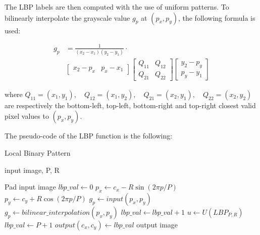 \documentclass[10pt,twocolumn,letterpaper]{article}
\begin{document}
The LBP labels are then computed with the use of uniform patterns.
To bilinearly interpolate the grayscale value $g_p$ at $(p_x, p_y)$, the following formula is used:

\begin{equation*}
	\begin{split} 
		g_p & = \frac{1}{(x_2 - x_1)(y_2 - y_1)} \cdot \\ &
		\begin{bmatrix}
			x_2 - p_x & p_x - x_1
		\end{bmatrix}
		\begin{bmatrix}
			Q_{11} & Q_{12} \\
			Q_{21} & Q_{22}
		\end{bmatrix}
		\begin{bmatrix}
			y_2 - p_y \\ 
			p_y - y_1
		\end{bmatrix}
	\end{split}
\end{equation*}


where $Q_{11} = (x_1, y_1), \quad Q_{12} = (x_1, y_2), \quad Q_{21} = (x_2, y_1), \quad Q_{22} = (x_2, y_2)$ are respectively the bottom-left, top-left, bottom-right and top-right closest valid pixel values to $(p_x, p_y)$.

The pseudo-code of the LBP function is the following:

\begin{algorithm}[H]
	\caption{Local Binary Pattern}
	\label{alg:lbp}
	\begin{algorithmic}
		\Require input image, P, R
		\vspace{0.5cm}
		
		\State Pad input image
		\For{$cy \in [0...height)$}
		\For{$cx \in [0...width$)}
		\State $lbp\_val \leftarrow 0$
		\For{$p \in [0...P)$}
		\State $p_x \leftarrow c_x - R\sin(2\pi p/P)$
		\State $p_y \leftarrow c_y + R\cos(2\pi p/P)$
		\State $g_p \leftarrow input(p_x, p_y)$
		\Else
		\State $g_p \leftarrow bilinear\_interpolation(p_x, p_y)$
		\EndIf
		\State $lbp\_val \leftarrow lbp\_val + 1$
		\EndIf
		\EndFor
		\State $u \leftarrow U(LBP_{P, R})$
		\State $lbp\_val \leftarrow P + 1$
		\EndIf
		\State $output(c_x, c_y) \leftarrow lbp\_val$
		\EndFor
		\EndFor
		\State \Return output image
		
	\end{algorithmic}
\end{algorithm}
\end{document}
